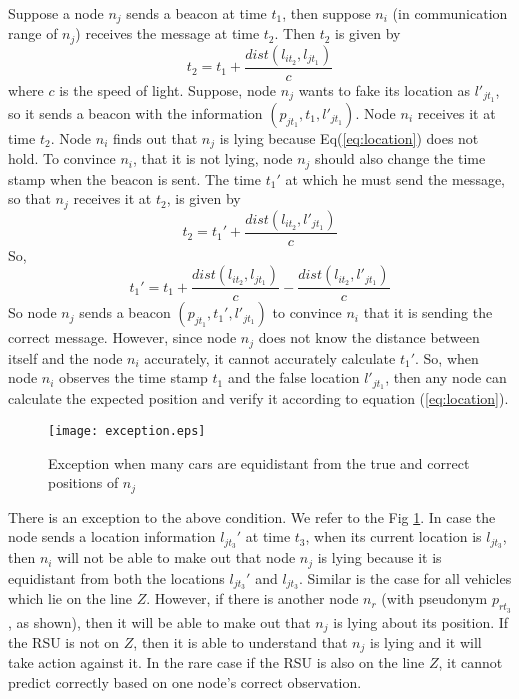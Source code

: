 \documentclass[conference]{IEEEtran}[10pt]
\begin{document}
Suppose a node $n_j$ sends a beacon at time $t_1$, then suppose $n_i$ (in communication range of $n_j$) receives the message at time $t_2$. 
Then $t_{2}$ is given by 
\begin{equation}
t_{2} = t_{1} + \frac{dist(l_{it_2},l_{jt_1})}{c}
\label{eq:location}
\end{equation}
where $c$ is the speed of light. 
Suppose, node $n_j$ wants to fake its location as $l'_{jt_1}$, so it sends a beacon with the information
$(p_{jt_1},t_1,l'_{jt_1})$. Node $n_i$ receives it at time $t_2$. 
Node $n_i$ finds out that $n_j$ is lying because Eq(\ref{eq:location}) does not hold. 
To convince $n_i$,  that it is not lying, node $n_j$ should also change the time stamp when the beacon is sent. 
The time $t_1'$ at which he must send the
message, so that $n_j$ receives it at $t_2$, is given by
\begin{equation}
t_2 = t_1' + \frac{dist(l_{it_2}, l'_{jt_1})}{c}
\end{equation}
So, 
\begin{equation}
t_1' = t_{1} +  \frac{dist(l_{it_2},l_{jt_1})}{c} - \frac{dist(l_{it_2}, l'_{jt_1})}{c} 
\end{equation}
So node $n_j$ sends a beacon $(p_{jt_1}, t_1', l'_{jt_1})$ to convince $n_i$ that it is sending the correct message. 
However, since node $n_j$ does not know the distance  between itself and the node $n_i$ accurately,   
it cannot accurately calculate $t_1'$. 
So, when node $n_i$ observes the time stamp $t_1$ and the false location $l'_{jt_1}$, then any node can 
calculate the expected position and verify it according to equation (\ref{eq:location}). 


\begin{figure}[htb]
\begin{centering}
\texttt{[image: exception.eps]}
\caption{
Exception when many cars are equidistant from the true and correct positions of $n_j$
}
\label{fig:exception}
\end{centering}
\end{figure}

There is an exception to the above condition. 
We refer to the Fig \ref{fig:exception}. 
In case the node sends a location information $l_{jt_3}'$ at time $t_3$, when its current location is $l_{jt_3}$, 
then $n_i$ will not be able to make out that node $n_j$ is lying because it is equidistant from both
the locations $l_{jt_3}'$ and $l_{jt_3}$. 
Similar is the case for all vehicles which lie on the line $Z$. 
However, if there is another node $n_r$ (with pseudonym $p_{rt_3}$, as shown),  then it will be able to make out that $n_j$ is lying about its position. 
If the RSU is not on $Z$, then it is able to understand that $n_j$ is lying and  it will take action against it. 
In the rare case if the RSU is also on the line $Z$, it cannot predict correctly based on one node's correct observation. 
\end{document}
